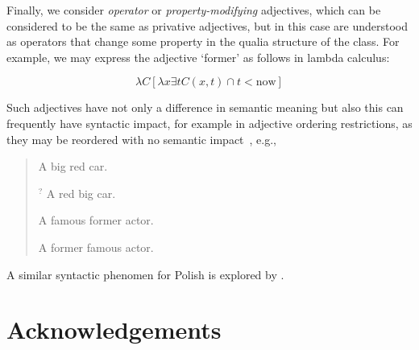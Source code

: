\documentclass[11pt]{article}
\begin{document}
Finally, we consider \emph{operator} or \emph{property-modifying} adjectives, which can be considered to be the same as privative adjectives, but in this case are understood as operators that change some property in the qualia structure of the class. For example, we may express the adjective `former' as follows in lambda calculus\cite{}:

$$\lambda C [\lambda x \exists t C(x,t) \cap t < \mathrm{now}]$$

Such adjectives have not only a difference in semantic meaning but also this can frequently have syntactic impact, for example in adjective ordering restrictions, as they may be reordered with no semantic impact~\cite{teodorescu2006adjective}, e.g.,

\begin{quote}
A big red car.

$^?$ A red big car.

A famous former actor.

A former famous actor.
\end{quote}

A similar syntactic phenomen for Polish is explored by \cite{partee}.

\section*{Acknowledgements}



\end{document}
